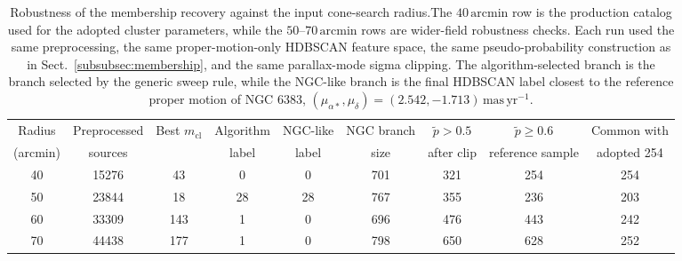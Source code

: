 \documentclass{aa}
\providecommand{\DIFdeltex}[1]{{\protect\color[rgb]{0.65,0,0}\footnotesize #1}} %
\providecommand{\DIFdelFL}[1]{\DIFdel{#1}} %
\providecommand{\DIFaddbeginFL}{} %
\providecommand{\DIFaddendFL}{} %
\providecommand{\DIFdelbeginFL}{} %
\providecommand{\DIFdelendFL}{} %
\providecommand{\DIFdel}[1]{\texorpdfstring{\DIFdeltex{#1}}{}} %
\providecommand{\DIFscaledelfig}{0.5}
\newlength{\DIFdelgraphicswidth} %
\newlength{\DIFdelgraphicsheight} %
\providecommand{\DIFaddincludegraphics}[2][]{{\color{blue}\fbox{\DIFOincludegraphics[#1]{#2}}}} %
\providecommand{\DIFdelincludegraphics}[2][]{%
\sbox{\DIFdelgraphicsbox}{\DIFOincludegraphics[#1]{#2}}%
\settoboxwidth{\DIFdelgraphicswidth}{\DIFdelgraphicsbox} %
\settoboxtotalheight{\DIFdelgraphicsheight}{\DIFdelgraphicsbox} %
\scalebox{\DIFscaledelfig}{%
\parbox[b]{\DIFdelgraphicswidth}{\usebox{\DIFdelgraphicsbox}\\[-\baselineskip] \rule{\DIFdelgraphicswidth}{0em}}\llap{\resizebox{\DIFdelgraphicswidth}{\DIFdelgraphicsheight}{%
\setlength{\unitlength}{\DIFdelgraphicswidth}%
\begin{picture}(1,1)%
\thicklines\linethickness{2pt} %
{\color[rgb]{1,0,0}\put(0,0){\framebox(1,1){}}}%
{\color[rgb]{1,0,0}\put(0,0){\line( 1,1){1}}}%
{\color[rgb]{1,0,0}\put(0,1){\line(1,-1){1}}}%
\end{picture}%
}\hspace*{3pt}}} %
} %
\DeclareRobustCommand{\DIFaddbeginFL}{\DIFOaddbeginFL \let\includegraphics\DIFaddincludegraphics} %
\DeclareRobustCommand{\DIFaddendFL}{\DIFOaddendFL \let\includegraphics\DIFOincludegraphics} %
\DeclareRobustCommand{\DIFdelbeginFL}{\DIFOdelbeginFL \let\includegraphics\DIFdelincludegraphics} %
\DeclareRobustCommand{\DIFdelendFL}{\DIFOaddendFL \let\includegraphics\DIFOincludegraphics} %
\begin{document}
\begin{appendix}
\begin{table}
		\caption{Robustness of the membership recovery against the input cone-search radius.\DIFdelbeginFL \DIFdelFL{The $40\,\mathrm{arcmin}$ row is the production catalog used for the adopted cluster parameters, while the $50$--$70\,\mathrm{arcmin}$ rows are wider-field robustness checks. Each run used the same preprocessing, the same proper-motion-only HDBSCAN feature space, the same pseudo-probability construction as in Sect.~\ref{subsubsec:membership}, and the same parallax-mode sigma clipping. The algorithm-selected branch is the branch selected by the generic sweep rule, while the NGC-like branch is the final HDBSCAN label closest to the reference proper motion of NGC 6383, $(\mu_{\alpha*},\mu_{\delta})=(2.542,-1.713)\,\mathrm{mas\,yr^{-1}}$.}\DIFdelendFL }
	\centering
	\begin{tabular}{ccccccccc}
		\hline
		Radius & Preprocessed & Best $m_\mathrm{cl}$ & Algorithm & NGC-like & NGC branch & $\tilde{p}>0.5$ & $\tilde{p}\geq0.6$ & Common with \\
		(arcmin) & sources &  & label & label & size & after clip & reference sample & adopted 254 \\
		\hline
		40 & 15276 & 43  & 0  & 0  & 701 & 321 & 254 & 254 \\
		50 & 23844 & 18  & 28 & 28 & 767 & 355 & 236 & 203 \\
		60 & 33309 & 143 & 1  & 0  & 696 & 476 & 443 & 242 \\
		70 & 44438 & 177 & 1  & 0  & 798 & 650 & 628 & 252 \\
		\hline
	\end{tabular}%
\DIFaddbeginFL {}%
	\DIFaddendFL \label{tab:cone_robustness}
\end{table}


\end{appendix}
\end{document}
